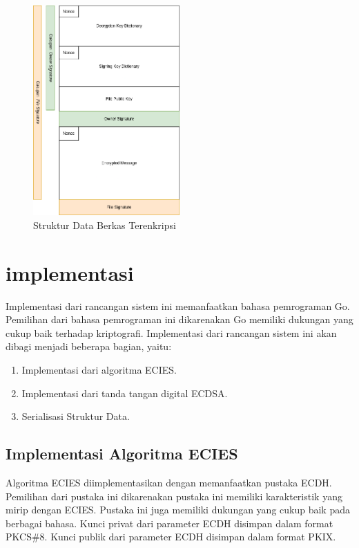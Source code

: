 \documentclass[conference]{IEEEtran}
\begin{document}
\begin{figure}[htbp]
    \centerline{\includegraphics[width=0.5\textwidth]{res/struktur.png}}
    \caption{Struktur Data Berkas Terenkripsi}
    \label{fig:struktur}
\end{figure}

\section{implementasi}

Implementasi dari rancangan sistem ini memanfaatkan bahasa pemrograman Go. Pemilihan dari bahasa pemrograman ini dikarenakan Go memiliki dukungan yang cukup baik terhadap kriptografi. Implementasi dari rancangan sistem ini akan dibagi menjadi beberapa bagian, yaitu:

\begin{enumerate}
    \item Implementasi dari algoritma ECIES.
    \item Implementasi dari tanda tangan digital ECDSA.
    \item Serialisasi Struktur Data.
\end{enumerate}

\subsection{Implementasi Algoritma ECIES}

Algoritma ECIES diimplementasikan dengan memanfaatkan pustaka ECDH. Pemilihan dari pustaka ini dikarenakan pustaka ini memiliki karakteristik yang mirip dengan ECIES. Pustaka ini juga memiliki dukungan yang cukup baik pada berbagai bahasa. Kunci privat dari parameter ECDH disimpan dalam format PKCS\#8. Kunci publik dari parameter ECDH disimpan dalam format PKIX.
\end{document}
